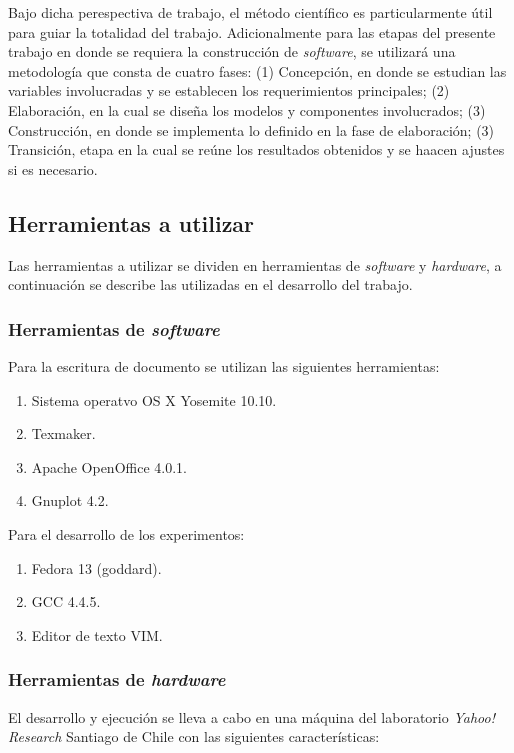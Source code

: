 Bajo dicha perespectiva de trabajo, el método científico es particularmente útil para guiar la totalidad del trabajo.
Adicionalmente para las etapas del presente trabajo en donde se requiera la construcción de \textit{software}, se utilizará una metodología que consta de cuatro fases: (1) Concepción, en donde se estudian las variables involucradas y se establecen los requerimientos principales; (2) Elaboración, en la cual se diseña los modelos y componentes involucrados; (3) Construcción, en donde se implementa lo definido en la fase de elaboración; (3) Transición, etapa en la cual se reúne los resultados obtenidos y se haacen ajustes si es necesario.  

\subsection{Herramientas a utilizar}
\label{intro:herramientas}
Las herramientas a utilizar se dividen en herramientas de \textit{software} y \textit{hardware}, a continuación se describe las utilizadas en el desarrollo del trabajo.

\subsubsection{Herramientas de \textit{software}}
Para la escritura de documento se utilizan las siguientes herramientas: 

\begin{enumerate}
  \item Sistema operatvo OS X Yosemite 10.10.
  \item Texmaker.
  \item Apache OpenOffice 4.0.1.
  \item Gnuplot 4.2.  
\end{enumerate}

Para el desarrollo de los experimentos:

\begin{enumerate}
  \item Fedora 13 (goddard).
  \item GCC 4.4.5.
  \item Editor de texto VIM.
\end{enumerate}

\subsubsection{Herramientas de \textit{hardware}}
El desarrollo y ejecución se lleva a cabo en una máquina del laboratorio \textit{Yahoo!} \textit{Research} Santiago de Chile con las siguientes características: 

